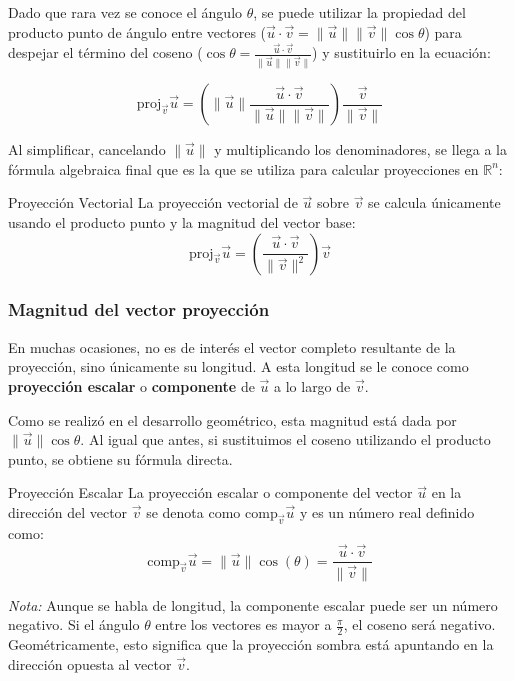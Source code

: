 Dado que rara vez se conoce el ángulo $\theta$, se puede utilizar la propiedad del producto punto de ángulo entre vectores ($\vec{u} \cdot \vec{v} = \|\vec{u}\|\|\vec{v}\| \cos\theta$) para despejar el término del coseno ($\cos\theta = \frac{\vec{u} \cdot \vec{v}}{\|\vec{u}\|\|\vec{v}\|}$) y sustituirlo en la ecuación:

\[ \text{proj}_{\vec{v}}\vec{u} = \left( \|\vec{u}\| \frac{\vec{u} \cdot \vec{v}}{\|\vec{u}\|\|\vec{v}\|} \right) \frac{\vec{v}}{\|\vec{v}\|} \]

Al simplificar, cancelando $\|\vec{u}\|$ y multiplicando los denominadores, se llega a la fórmula algebraica final que es la que se utiliza para calcular proyecciones en $\mathbb{R}^n$:

\begin{mydefinition}{Proyección Vectorial}
La proyección vectorial de $\vec{u}$ sobre $\vec{v}$ se calcula únicamente usando el producto punto y la magnitud del vector base:
\[ \text{proj}_{\vec{v}}\vec{u} = \left( \frac{\vec{u} \cdot \vec{v}}{\|\vec{v}\|^2} \right) \vec{v} \]
\end{mydefinition}

\subsubsection{Magnitud del vector proyección}

En muchas ocasiones, no es de interés el vector completo resultante de la proyección, sino únicamente su longitud. A esta longitud se le conoce como \textbf{proyección escalar} o \textbf{componente} de $\vec{u}$ a lo largo de $\vec{v}$.

Como se realizó en el desarrollo geométrico, esta magnitud está dada por $\|\vec{u}\| \cos\theta$. Al igual que antes, si sustituimos el coseno utilizando el producto punto, se obtiene su fórmula directa.

\begin{mydefinition}{Proyección Escalar}
La proyección escalar o componente del vector $\vec{u}$ en la dirección del vector $\vec{v}$ se denota como $\text{comp}_{\vec{v}}\vec{u}$ y es un número real definido como:
\[ \text{comp}_{\vec{v}}\vec{u} = \|\vec{u}\| \cos(\theta) = \frac{\vec{u} \cdot \vec{v}}{\|\vec{v}\|} \]
\end{mydefinition}

\textit{Nota:} Aunque se habla de longitud, la componente escalar puede ser un número negativo. Si el ángulo $\theta$ entre los vectores es mayor a $\frac{\pi}{2}$, el coseno será negativo. Geométricamente, esto significa que la proyección sombra está apuntando en la dirección opuesta al vector $\vec{v}$.


